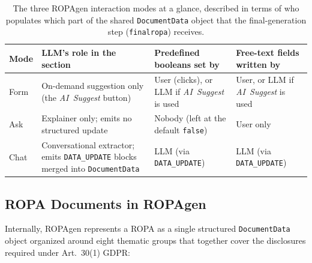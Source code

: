 \begin{table}[htbp]
    \centering
    \caption{The three ROPAgen interaction modes at a glance,
    described in terms of who populates which part of the shared
    \texttt{DocumentData} object that the final-generation step
    (\texttt{finalropa}) receives.}
    \label{tab:modes-overview}
    \small
    \begin{tabularx}{\linewidth}{@{}l X X X@{}}
        \toprule
        Mode & LLM's role in the section & Predefined booleans set by & Free-text fields written by \\
        \midrule
        Form & On-demand suggestion only (the \emph{AI~Suggest} button) & User (clicks), or LLM if \emph{AI~Suggest} is used & User, or LLM if \emph{AI~Suggest} is used \\
        Ask  & Explainer only; emits no structured update & Nobody (left at the default \texttt{false}) & User only \\
        Chat & Conversational extractor; emits \texttt{DATA\_UPDATE} blocks merged into \texttt{DocumentData} & LLM (via \texttt{DATA\_UPDATE}) & LLM (via \texttt{DATA\_UPDATE}) \\
        \bottomrule
    \end{tabularx}
\end{table}

\subsection{ROPA Documents in ROPAgen}

Internally, ROPAgen represents a ROPA as a single structured \texttt{DocumentData} object organized around eight thematic groups that together cover the disclosures required under Art.~30(1) GDPR:

